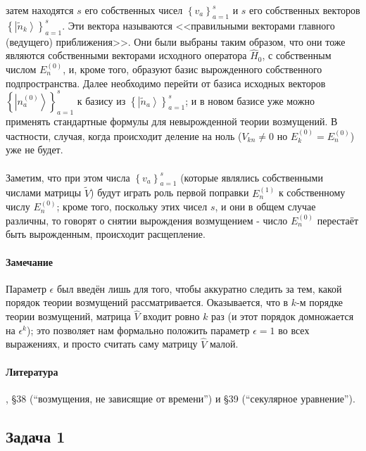 \documentclass[a4paper,12pt]{article}
\begin{document}
\noindent
затем находятся $s$ его собственных чисел $\left\{ v_{a}\right\} _{a=1}^{s}$
и $s$ его собственных векторов $\left\{ \left|\widetilde{n}_{k}\right\rangle \right\} _{a=1}^{s}$.
Эти вектора называются <<правильными векторами главного (ведущего)
приближения>>. Они были выбраны таким образом, что они тоже являются
собственными векторами исходного оператора $\hat{H}_{0}$, с собственным
числом $E_{n}^{(0)}$, и, кроме того, образуют базис вырожденного
собственного подпространства. Далее необходимо перейти от базиса исходных
векторов $\left\{ \left|n_{a}^{(0)}\right\rangle \right\} _{a=1}^{s}$
к базису из $\left\{ \left|\widetilde{n}_{a}\right\rangle \right\} _{a=1}^{s}$;
и в новом базисе уже можно применять стандартные формулы для невырожденной
теории возмущений. В частности, случая, когда происходит деление на
ноль ($V_{kn}\neq0$ но $E_{k}^{(0)}=E_{n}^{(0)}$) уже не будет.\\\\
Заметим, что при этом числа $\left\{ v_{a}\right\} _{a=1}^{s}$ (которые
являлись собственными числами матрицы $\widetilde{V}$) будут играть
роль первой поправки $E_{n}^{(1)}$ к собственному числу $E_{n}^{(0)}$;
кроме того, поскольку этих чисел $s$, и они в общем случае различны,
то говорят о снятии вырождения возмущением - число $E_{n}^{(0)}$
перестаёт быть вырожденным, происходит расщепление.


\paragraph{Замечание}

Параметр $\epsilon$ был введён лишь для того, чтобы аккуратно следить
за тем, какой порядок теории возмущений рассматривается. Оказывается,
что в $k$-м порядке теории возмущений, матрица $\hat{V}$ входит
ровно $k$ раз (и этот порядок домножается на $\epsilon^{k}$); это
позволяет нам формально положить параметр $\epsilon=1$ во всех выражениях,
и просто считать саму матрицу $\hat{V}$ малой.

\paragraph{Литература}
\cite{LL3}, §38 (``возмущения, не зависящие от времени'') и §39 (``секулярное уравнение'').

\subsection*{Задача 1}
\end{document}
